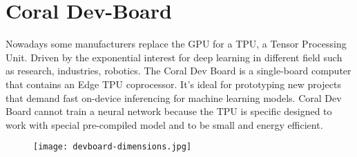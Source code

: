 \section{Coral Dev-Board}
\label{sec:hard-devboard}
Nowadays some manufacturers replace the GPU for a TPU, a Tensor Processing Unit.
Driven by the exponential interest for deep learning in different field such as
research, industries, robotics. The Coral Dev Board is a single-board computer
that contains an Edge TPU coprocessor. It's ideal for prototyping new projects
that demand fast on-device inferencing for machine learning models. Coral Dev
Board cannot train a neural network because the TPU is specific designed to work
with special pre-compiled model and to be small and energy efficient.
%
\begin{figure}[htb]
	\centering
	\texttt{[image: devboard-dimensions.jpg]}
	\label{fig:dev-board}
\end{figure}
%
